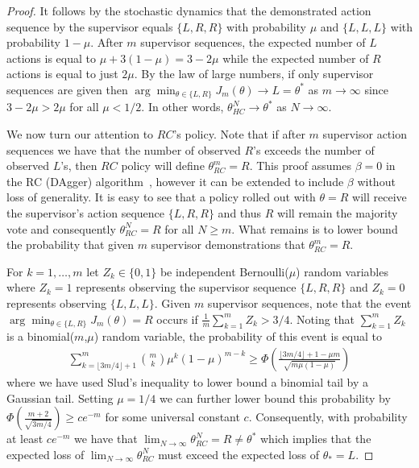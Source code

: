 \documentclass[10pt, conference]{ieeeconf}      %
\begin{document}
\begin{proof}
It follows by the stochastic dynamics that the demonstrated action sequence by the supervisor equals $\{L,R,R\}$ with probability $\mu$ and $\{L,L,L\}$ with probability $1-\mu$.
After $m$ supervisor sequences, the expected number of $L$ actions is equal to $\mu+3(1-\mu)=3-2\mu$ while the expected number of $R$ actions is equal to just $2\mu$. 
By the law of large numbers, if only supervisor sequences are given then $\arg\min_{\theta \in \{L,R\}} J_m(\theta) \rightarrow L = \theta^*$ as $m \rightarrow \infty$ since $3-2\mu>2\mu$ for all $\mu<1/2$. 
In other words, $\theta_{HC}^N \rightarrow \theta^*$ as $N \rightarrow \infty$.

We now turn our attention to $RC$'s policy.
Note that if after $m$ supervisor action sequences we have that the number of observed $R$'s exceeds the number of observed $L$'s, then $RC$ policy will define $\theta_{RC}^m = R$.  This proof assumes $\beta=0$ in the RC (DAgger) algorithm~\cite{ross2010reduction}, however it can be extended to include $\beta$ without loss of generality. 
It is easy to see that a policy rolled out with $\theta=R$ will receive the supervisor's action sequence $\{L,R,R\}$ and thus $R$ will remain the majority vote and consequently $\theta_{RC}^N=R$ for all $N \geq m$.
What remains is to lower bound the probability that given $m$ supervisor demonstrations that $\theta_{RC}^m = R$. 

For $k=1,\dots,m$ let $Z_k \in \{0,1\}$ be independent Bernoulli($\mu$) random variables where $Z_k=1$ represents observing the supervisor sequence $\{L,R,R\}$ and $Z_k=0$ represents observing $\{L,L,L\}$.
Given $m$ supervisor sequences, note that the event $\arg\min_{\theta \in \{L,R\}} J_m(\theta) = R$ occurs if $\frac{1}{m}\sum_{k=1}^m Z_k > 3/4$. 
Noting that $\sum_{k=1}^m Z_k$ is a binomial($m$,$\mu$) random variable, the probability of this event is equal to 
\begin{align*}
\sum_{k=\lfloor 3m/4 \rfloor+1}^m \binom{m}{k} \mu^k (1-\mu)^{m-k} \geq \Phi\left( \frac{\lfloor 3m/4 \rfloor+1 - \mu m}{ \sqrt{m \mu(1-\mu)}} \right) 
\end{align*} 
where we have used Slud's inequality \cite{slud1977} to lower bound a binomial tail by a Gaussian tail. 
Setting $\mu=1/4$ we can further lower bound this probability by $\Phi\left( \frac{m + 2}{ \sqrt{3m/4}} \right) \geq c e^{-m}$ for some universal constant $c$.
Consequently, with probability at least $c e^{-m}$ we have that $\lim_{N \rightarrow \infty} \theta_{RC}^N = R \neq \theta^*$ which implies that the expected loss of $\lim_{N \rightarrow \infty} \theta_{RC}^N$ must exceed the expected loss of $\theta_*=L$. 
\end{proof}
\end{document}
